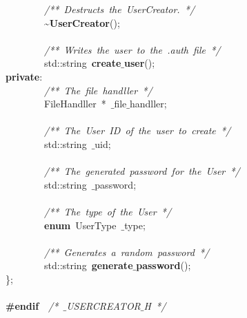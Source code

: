 \mbox{}\ \ \ \ \ \ \ \ \textit{/**\ Destructs\ the\ UserCreator.\ */} \\
\mbox{}\ \ \ \ \ \ \ \ \textasciitilde{}\textbf{UserCreator}(); \\
\mbox{} \\
\mbox{}\ \ \ \ \ \ \ \ \textit{/**\ Writes\ the\ user\ to\ the\ .auth\ file\ */} \\
\mbox{}\ \ \ \ \ \ \ \ std::string\ \textbf{create$\_$user}(); \\
\mbox{}\textbf{private}: \\
\mbox{}\ \ \ \ \ \ \ \ \textit{/**\ The\ file\ handller\ */} \\
\mbox{}\ \ \ \ \ \ \ \ FileHandller\ *\ $\_$file$\_$handller; \\
\mbox{} \\
\mbox{}\ \ \ \ \ \ \ \ \textit{/**\ The\ User\ ID\ of\ the\ user\ to\ create\ */} \\
\mbox{}\ \ \ \ \ \ \ \ std::string\ $\_$uid; \\
\mbox{} \\
\mbox{}\ \ \ \ \ \ \ \ \textit{/**\ The\ generated\ password\ for\ the\ User\ */} \\
\mbox{}\ \ \ \ \ \ \ \ std::string\ $\_$password; \\
\mbox{} \\
\mbox{}\ \ \ \ \ \ \ \ \textit{/**\ The\ type\ of\ the\ User\ */} \\
\mbox{}\ \ \ \ \ \ \ \ \textbf{enum}\ UserType\ $\_$type; \\
\mbox{} \\
\mbox{}\ \ \ \ \ \ \ \ \textit{/**\ Generates\ a\ random\ password\ */} \\
\mbox{}\ \ \ \ \ \ \ \ std::string\ \textbf{generate$\_$password}(); \\
\mbox{}\}; \\
\mbox{} \\
\mbox{}\textbf{\#endif}\ \ \textit{/*\ $\_$USERCREATOR$\_$H\ */} \\

\clearpage
\normalsize
\rmfamily
